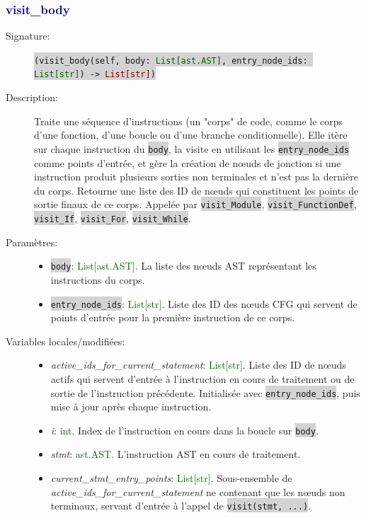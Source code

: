 \documentclass[11pt,a4paper]{article}
\newcommand{\code}[1]{\colorbox{lightgray}{\texttt{\small #1}}}
\newcommand{\var}[1]{\textit{#1}}
\newcommand{\vartype}[1]{\textcolor{darkgreen}{#1}}
\newcommand{\methodname}[1]{\textbf{\textcolor{darkblue}{#1}}}
\newcommand{\param}[1]{\code{#1}}
\newcommand{\rettype}[1]{\textcolor{darkred}{#1}}
\begin{document}
\subsubsection*{\methodname{visit\_body}}
\begin{description}
    \item[Signature:] \code{(visit\_body(self, body: \vartype{List[ast.AST]}, entry\_node\_ids: \vartype{List[str]}) -> \rettype{List[str]})}
    \item[Description:] Traite une séquence d'instructions (un "corps" de code, comme le corps d'une fonction, d'une boucle ou d'une branche conditionnelle). Elle itère sur chaque instruction du \param{body}, la visite en utilisant les \param{entry\_node\_ids} comme points d'entrée, et gère la création de nœuds de jonction si une instruction produit plusieurs sorties non terminales et n'est pas la dernière du corps. Retourne une liste des ID de nœuds qui constituent les points de sortie finaux de ce corps. Appelée par \code{visit\_Module}, \code{visit\_FunctionDef}, \code{visit\_If}, \code{visit\_For}, \code{visit\_While}.
    \item[Paramètres:]
    \begin{itemize}
        \item \param{body}: \vartype{List[ast.AST]}. La liste des nœuds AST représentant les instructions du corps.
        \item \param{entry\_node\_ids}: \vartype{List[str]}. Liste des ID des nœuds CFG qui servent de points d'entrée pour la première instruction de ce corps.
    \end{itemize}
    \item[Variables locales/modifiées:]
    \begin{itemize}
        \item \var{active\_ids\_for\_current\_statement}: \vartype{List[str]}. Liste des ID de nœuds actifs qui servent d'entrée à l'instruction en cours de traitement ou de sortie de l'instruction précédente. Initialisée avec \param{entry\_node\_ids}, puis mise à jour après chaque instruction.
        \item \var{i}: \vartype{int}. Index de l'instruction en cours dans la boucle sur \param{body}.
        \item \var{stmt}: \vartype{ast.AST}. L'instruction AST en cours de traitement.
        \item \var{current\_stmt\_entry\_points}: \vartype{List[str]}. Sous-ensemble de \var{active\_ids\_for\_current\_statement} ne contenant que les nœuds non terminaux, servant d'entrée à l'appel de \code{visit(stmt, ...)}.

\end{itemize}
\end{description}
\end{document}
